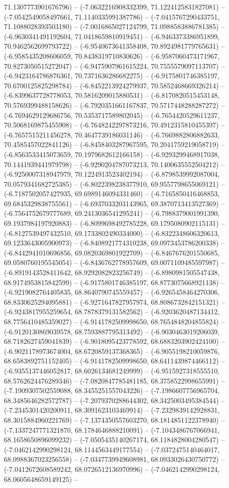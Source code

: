71.1307773901676796) -- (-7.0632216908332399, 71.1224125831827081) -- (-7.0542549058497661, 71.1140335991387786) -- (-7.0415767290433751, 71.1088028393503180) -- (-7.0016865027124799, 71.0988583886781385) -- (-6.9630341491192604, 71.0418659810919451) -- (-6.9463373386951899, 70.9462562699793722) -- (-6.9540673641358408, 70.8924981779765631) -- (-6.9585435208606059, 70.8438319710830626) -- (-6.9587060473171967, 70.8273050515272047) -- (-6.9475907961615224, 70.7555579097113707) -- (-6.9423164786876361, 70.7371636286682275) -- (-6.9175801746385197, 70.6700125825298784) -- (-6.8452213924279937, 70.5852468669326214) -- (-6.8399637728778053, 70.5816209015880531) -- (-6.8170820515453148, 70.5769399488158626) -- (-6.7920351661167837, 70.5717448288287272) -- (-6.7694629129686756, 70.5353717589802045) -- (-6.7654420529611237, 70.5068169875455908) -- (-6.7648242297873216, 70.4912315810455397) -- (-6.7657515211456278, 70.4647739186031146) -- (-6.7669882806882633, 70.4585457022841126) -- (-6.8458403287967595, 70.2041759219058719) -- (-6.8563533415073659, 70.1979682612166158) -- (-6.9293299468917038, 70.1441939441979798) -- (-6.9290204787073213, 70.1400635552504212) -- (-6.9250007318947979, 70.1224913523402194) -- (-6.8798539992087004, 70.0579341682725385) -- (-6.8022398238377910, 69.9557798655069121) -- (-6.7187502057427935, 69.6989146094331460) -- (-6.7165850416468853, 69.6845329838755561) -- (-6.6937033203143965, 69.3870713413527369) -- (-6.7564752679777689, 69.2413036541295241) -- (-6.7988379001991390, 69.1937984197920883) -- (-6.8099698492785228, 69.1795080902115131) -- (-6.8127539497432510, 69.1733802490334000) -- (-6.8322348606320613, 69.1233643005900973) -- (-6.8408921774310238, 69.0973453786200338) -- (-6.8442941010696856, 69.0820369801922709) -- (-6.8467676201550685, 69.0580760195545054) -- (-6.8436762778957609, 69.0071109485597987) -- (-6.8919143528411642, 68.9292082823256749) -- (-6.8980981505547438, 68.9174953815842599) -- (-6.9175801746385197, 68.8773075668921138) -- (-6.9219082764405835, 68.8640790745559457) -- (-6.9265458464270306, 68.8330625294095881) -- (-6.9271647827957974, 68.8086732842151321) -- (-6.9243817955259654, 68.7878379131582562) -- (-6.9203620487134412, 68.7756410485359027) -- (-6.9141782509998650, 68.7654848204855824) -- (-6.9120130869039578, 68.7593887795313492) -- (-6.9030463019206039, 68.7182627459041839) -- (-6.9018095423778592, 68.6883203902424100) -- (-6.9021178973674004, 68.6720859137368365) -- (-6.9055198210059876, 68.6583892751152405) -- (-6.9141782509998650, 68.6411439874466112) -- (-6.9355137446052817, 68.6026134681249999) -- (-6.9515927318555510, 68.5762624476289346) -- (-7.0820847785481185, 68.3758522998655991) -- (-7.1909307502559088, 68.3455251557043226) -- (-7.1986607756965704, 68.3485646282572787) -- (-7.2079370288644302, 68.3425003495384544) -- (-7.2345301420200911, 68.3091623103469914) -- (-7.2329839142928831, 68.3015884960221769) -- (-7.1374350557603270, 68.1814851122378940) -- (-7.1337247771321870, 68.1784646888210091) -- (-7.1043486767066941, 68.1658650896099232) -- (-7.0505435140267174, 68.1184828004280547) -- (-7.0462142990298124, 68.1144563449177554) -- (-7.0372475140464017, 68.0988367023256558) -- (-7.0347739949608981, 68.0933026430750772) -- (-7.0412672608589242, 68.0726512136970996) -- (-7.0462142990298124, 68.0605648659149125) -- 
